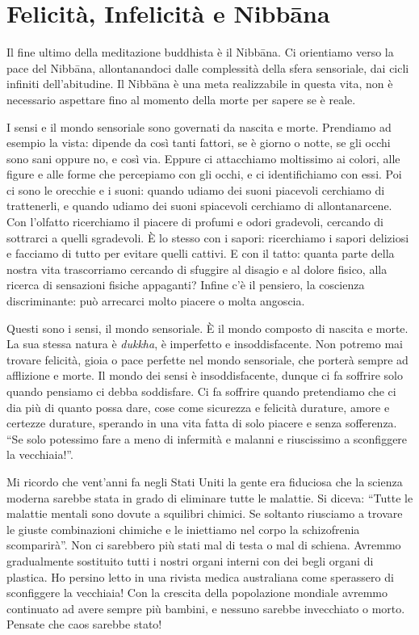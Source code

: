 \chapter{Felicità, Infelicità e Nibbāna}

Il fine ultimo della meditazione buddhista è il Nibbāna. Ci orientiamo
verso la pace del Nibbāna, allontanandoci dalle complessità della sfera
sensoriale, dai cicli infiniti dell'abitudine. Il Nibbāna è una meta
realizzabile in questa vita, non è necessario aspettare fino al momento
della morte per sapere se è reale.

I sensi e il mondo sensoriale sono governati da nascita e morte.
Prendiamo ad esempio la vista: dipende da così tanti fattori, se è
giorno o notte, se gli occhi sono sani oppure no, e così via. Eppure ci
attacchiamo moltissimo ai colori, alle figure e alle forme che
percepiamo con gli occhi, e ci identifichiamo con essi. Poi ci sono le
orecchie e i suoni: quando udiamo dei suoni piacevoli cerchiamo di
trattenerli, e quando udiamo dei suoni spiacevoli cerchiamo di
allontanarcene. Con l'olfatto ricerchiamo il piacere di profumi e odori
gradevoli, cercando di sottrarci a quelli sgradevoli. È lo stesso con i
sapori: ricerchiamo i sapori deliziosi e facciamo di tutto per evitare
quelli cattivi. E con il tatto: quanta parte della nostra vita
trascorriamo cercando di sfuggire al disagio e al dolore fisico, alla
ricerca di sensazioni fisiche appaganti? Infine c'è il pensiero, la
coscienza discriminante: può arrecarci molto piacere o molta angoscia.

Questi sono i sensi, il mondo sensoriale. È il mondo composto di nascita
e morte. La sua stessa natura è \emph{dukkha}, è imperfetto e
insoddisfacente. Non potremo mai trovare felicità, gioia o pace perfette
nel mondo sensoriale, che porterà sempre ad afflizione e morte. Il mondo
dei sensi è insoddisfacente, dunque ci fa soffrire solo quando pensiamo
ci debba soddisfare. Ci fa soffrire quando pretendiamo che ci dia più di
quanto possa dare, cose come sicurezza e felicità durature, amore e
certezze durature, sperando in una vita fatta di solo piacere e senza
sofferenza. ``Se solo potessimo fare a meno di infermità e malanni e
riuscissimo a sconfiggere la vecchiaia!''.

Mi ricordo che vent'anni fa negli Stati Uniti la gente era fiduciosa che
la scienza moderna sarebbe stata in grado di eliminare tutte le
malattie. Si diceva: ``Tutte le malattie mentali sono dovute a squilibri
chimici. Se soltanto riusciamo a trovare le giuste combinazioni chimiche
e le iniettiamo nel corpo la schizofrenia scomparirà''. Non ci sarebbero
più stati mal di testa o mal di schiena. Avremmo gradualmente sostituito
tutti i nostri organi interni con dei begli organi di plastica. Ho
persino letto in una rivista medica australiana come sperassero di
sconfiggere la vecchiaia! Con la crescita della popolazione mondiale
avremmo continuato ad avere sempre più bambini, e nessuno sarebbe
invecchiato o morto. Pensate che caos sarebbe stato!

